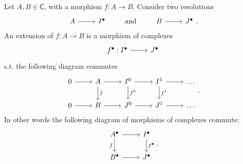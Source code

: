 \documentclass[../Main]{subfiles}
\begin{document}
\begin{defn}
	Let $A, B \in \mathsf{C}$, with a morphism
	$f\colon A \to B$.
	Consider two resolutions
	\begin{equation}
	\begin{tikzcd}
		A \arrow[r, "", rightarrow] &
		I^\bullet
	\end{tikzcd}
	\qquad \text{ and } \qquad
	\begin{tikzcd}
		B \arrow[r, "", rightarrow] &
		J^\bullet
	\end{tikzcd}
	.\end{equation} 
	An extension 
	of $f\colon A \to B$
	is a morphism of complexes
	\begin{equation}
		\begin{tikzcd}
		f^\bullet: I^\bullet \arrow[r, "", rightarrow] &
		J^\bullet
		\end{tikzcd}
	\end{equation} 
	s.t. the following diagram commutes
	\begin{equation}
	\begin{tikzcd}
		0 \arrow[r, "", rightarrow] &
		A \arrow[r, "", rightarrow] \arrow[d, "f", rightarrow] &
		I^0 \arrow[r, "", rightarrow] \arrow[d, "f^0", rightarrow] &
		I^1 \arrow[r, "", rightarrow] \arrow[d, "f^1", rightarrow] &
		\ldots\\
		0 \arrow[r, "", rightarrow] &
		B \arrow[r, "", rightarrow] &
		J^0 \arrow[r, "", rightarrow] &
		J^1 \arrow[r, "", rightarrow] &
		\ldots
	\end{tikzcd}
	.\end{equation} 
	In other words the following diagram of morphisms of complexes commute:
	\begin{equation}
	\begin{tikzcd}
		A^\bullet \arrow[r, "", rightarrow] 
		\arrow[d, "f"', rightarrow] &
		I^\bullet \arrow[d, "f^\bullet", rightarrow] \\
		B^\bullet \arrow[r, "", rightarrow] &
		J^\bullet
	\end{tikzcd}
	.\end{equation} 
\end{defn}
\end{document}

